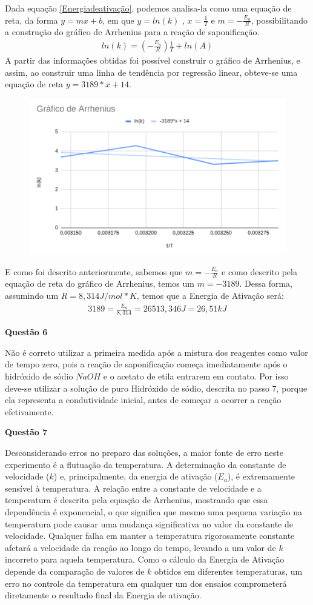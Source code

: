 \documentclass{article}
\begin{document}
 Dada  equação \cref{Energiadeativação}, podemos analisa-la como uma equação de reta, da forma \(y = mx + b\), em que \( y = ln (k)\) , \(x = \frac{1}{T}  \) e \( m = -\frac{E_a}{R}\), possibilitando a construção do gráfico de Arrhenius para a reação de saponificação.
 \begin{align}
	ln(k) = (-\frac{E_a}{R}) \frac{1}{T} + ln(A)
	\label{Energiadeativação}
 \end{align}
A partir das informações obtidas foi possível construir o gráfico de Arrhenius, e assim, ao construir uma linha de tendência por regressão linear, obteve-se uma equação de reta \(y = 3189*x + 14\). 
\begin{figure}[H]
	\centering
	\includegraphics[width=.5\linewidth]{figs/Arrhenius.png}
	\label{Arrhenius}
\end{figure}
E como foi descrito anteriormente, sabemos que \( m = -\frac{E_a}{R}\) e como descrito pela equação de reta do gráfico de Arrhenius, temos um \(m = -3189\). Dessa forma, assumindo um \(R = 8,314 J/mol*K\), temos que a Energia de Ativação será: 
\begin{align*}
	3189 = \frac{E_a}{8,314 } = 26513,346 J = 26,51 kJ
\end{align*}


\textbf{Questão 6}

Não é correto utilizar a primeira medida após a mistura dos reagentes como valor de tempo zero, pois a reação de saponificação começa imediatamente após o hidróxido de sódio \(NaOH\) e o acetato de etila entrarem em contato. Por isso deve-se utilizar a solução de puro Hidróxido de sódio, descrita no passo 7, porque ela representa a condutividade inicial, antes de começar a ocorrer a reação efetivamente. 


\textbf{Questão 7}

Desconsiderando erros no preparo das soluções, a maior fonte de erro neste experimento é a flutuação da temperatura.
A determinação da constante de velocidade (\(k\)) e, principalmente, da energia de ativação (\(E_a\)), é extremamente sensível à temperatura. A relação entre a constante de velocidade e a temperatura é descrita pela equação de Arrhenius, mostrando que essa dependência é exponencial, o que significa que mesmo uma pequena variação na temperatura pode causar uma mudança significativa no valor da constante de velocidade.
Qualquer falha em manter a temperatura rigorosamente constante afetará a velocidade da reação ao longo do tempo, levando a um valor de \(k\) incorreto para aquela temperatura. Como o cálculo da Energia de Ativação depende da comparação de valores de \(k\) obtidos em diferentes temperaturas, um erro no controle da temperatura em qualquer um dos ensaios comprometerá diretamente o resultado final da Energia de ativação.

  
\end{document}
